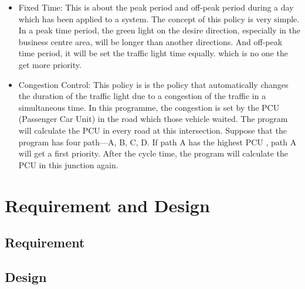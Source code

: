 \documentclass[11pt]{article}
\begin{document}
\begin{itemize}
		  		\begin{itemize}
			\item{} Fixed Time: This is about the peak period and off-peak period during a day which has been applied to a system. The concept of this policy is very simple. In a peak time period, the green light on the desire direction, especially in the business centre area, will be longer than another directions.  And off-peak time period, it will be set the traffic light time equally. which is no one the get more priority.   
			\item{} Congestion Control: This policy is is the policy that automatically changes the duration of the traffic light due to a congestion of the traffic in a simultaneous time. In this programme, the congestion is set by the PCU (Passenger Car Unit) in the road which those vehicle waited. The program will calculate the PCU in every road at this intersection. Suppose that the program has four path—A, B, C, D. If path A has the highest PCU , path A will get a first priority. After the cycle time, the program will calculate the PCU in this junction again.
			
  		\end{itemize}	
  		
  	\end{itemize}	
	
	
	
	
	
	
	  

	


\newpage	
\section{Requirement and Design}
	\subsection{Requirement}
	\subsection{Design}
	
\end{document}
